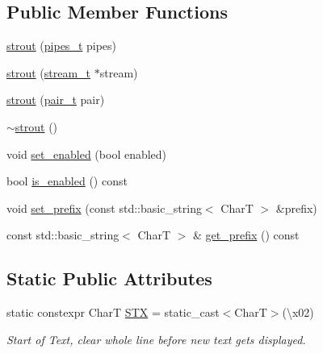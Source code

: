\subsection*{Public Member Functions}
\begin{DoxyCompactItemize}
\item 
\hyperlink{structdevfix_1_1base_1_1strout_a7711671b7f3457ed5cc509f7d7c7239f}{strout} (\hyperlink{structdevfix_1_1base_1_1strout_acf852ff3e37e6d10e2cf0332df2b8e2d}{pipes\+\_\+t} pipes)
\item 
\hyperlink{structdevfix_1_1base_1_1strout_a87b4c01cbcd87414d2c3a639713fcd08}{strout} (\hyperlink{structdevfix_1_1base_1_1strout_a158aadfad348eeac7c56a8b43699a4d3}{stream\+\_\+t} $\ast$stream)
\item 
\hyperlink{structdevfix_1_1base_1_1strout_a83d80540c9614d8d825a45acede871c5}{strout} (\hyperlink{structdevfix_1_1base_1_1strout_a2212cb8a99abec10490e891cc67820bb}{pair\+\_\+t} pair)
\item 
\hyperlink{structdevfix_1_1base_1_1strout_aeffa562814f23e6e74f5d8404d673ea7}{$\sim$strout} ()
\item 
void \hyperlink{structdevfix_1_1base_1_1strout_a49000248c873a593348082f151ccab9b}{set\+\_\+enabled} (bool enabled)
\item 
bool \hyperlink{structdevfix_1_1base_1_1strout_a62b7808c3d8b54dd926bdecabea7cbd2}{is\+\_\+enabled} () const
\item 
void \hyperlink{structdevfix_1_1base_1_1strout_ab32a1f2eb733dcba516e439f651f5910}{set\+\_\+prefix} (const std\+::basic\+\_\+string$<$ CharT $>$ \&prefix)
\item 
const std\+::basic\+\_\+string$<$ CharT $>$ \& \hyperlink{structdevfix_1_1base_1_1strout_afb40810ea1e7384f08e1f837e34ff1c2}{get\+\_\+prefix} () const
\end{DoxyCompactItemize}
\subsection*{Static Public Attributes}
\begin{DoxyCompactItemize}
\item 
static constexpr CharT \hyperlink{structdevfix_1_1base_1_1strout_a76183010a1d8e9360e34b9cd9ab33f7d}{S\+TX} = static\+\_\+cast$<$CharT$>$(\textquotesingle{}\textbackslash{}x02\textquotesingle{})
\begin{DoxyCompactList}\small\item\em Start of Text, clear whole line before new text gets displayed. \end{DoxyCompactList}\end{DoxyCompactItemize}
